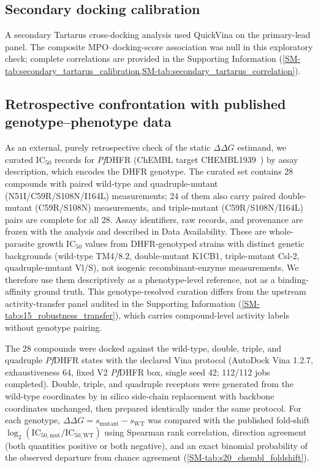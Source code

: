 \documentclass[11pt,a4paper]{article}
\begin{document}
\subsection{Secondary docking calibration}

A secondary Tartarus cross-docking analysis used QuickVina on the primary-lead panel. The composite MPO--docking-score association was null in this exploratory check; complete correlations are provided in the Supporting Information (\cref{SM-tab:secondary_tartarus_calibration,SM-tab:secondary_tartarus_correlation}).

\subsection{Retrospective confrontation with published genotype--phenotype data}

As an external, purely retrospective check of the static $\Delta\Delta G$ estimand, we curated IC$_{50}$ records for \textit{Pf}DHFR (ChEMBL target CHEMBL1939~\citep{zdrazil2024chembl}) by assay description, which encodes the DHFR genotype. The curated set contains 28 compounds with paired wild-type and quadruple-mutant (N51I/C59R/S108N/I164L) measurements; 24 of them also carry paired double-mutant (C59R/S108N) measurements, and triple-mutant (C59R/S108N/I164L) pairs are complete for all 28. Assay identifiers, raw records, and provenance are frozen with the analysis and described in Data Availability. These are whole-parasite growth IC$_{50}$ values from DHFR-genotyped strains with distinct genetic backgrounds (wild-type TM4/8.2, double-mutant K1CB1, triple-mutant Csl-2, quadruple-mutant Vl/S), not isogenic recombinant-enzyme measurements. We therefore use them descriptively as a phenotype-level reference, not as a binding-affinity ground truth. This genotype-resolved curation differs from the upstream activity-transfer panel audited in the Supporting Information (\cref{SM-tab:s15_robustness_transfer}), which carries compound-level activity labels without genotype pairing.

The 28 compounds were docked against the wild-type, double, triple, and quadruple \textit{Pf}DHFR states with the declared Vina protocol (AutoDock Vina 1.2.7, exhaustiveness \num{64}, fixed V2 \textit{Pf}DHFR box, single seed \num{42}; \num{112}/\num{112} jobs completed). Double, triple, and quadruple receptors were generated from the wild-type coordinates by in silico side-chain replacement with backbone coordinates unchanged, then prepared identically under the same protocol. For each genotype, $\Delta\Delta G = s_{\mathrm{mutant}} - s_{\mathrm{WT}}$ was compared with the published fold-shift $\log_2(\mathrm{IC}_{50,\mathrm{mut}}/\mathrm{IC}_{50,\mathrm{WT}})$ using Spearman rank correlation, direction agreement (both quantities positive or both negative), and an exact binomial probability of the observed departure from chance agreement (\cref{SM-tab:s20_chembl_foldshift}).
\end{document}
